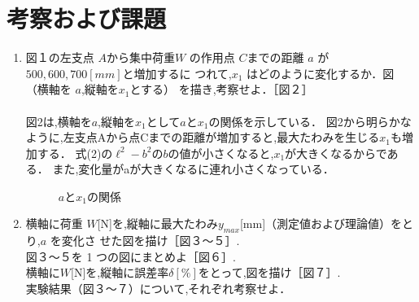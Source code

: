 \documentclass[a4paper,11pt]{jsarticle}
\begin{document}
\section{考察および課題}
\begin{enumerate}
  \item 図１の左支点 $A$から集中荷重$ W$ の作用点 $C $までの距離 $a$ が $500,600,700 [mm]$と増加するに
        つれて,$x_1$ はどのように変化するか．図（横軸を $a $,縦軸を$x_1$とする） を描き,考察せよ．［図２］\\
        \\
        \quad 図2は,横軸を$a$,縦軸を$x_1$として$a$と$x_1$の関係を示している．
        図2から明らかなように,左支点Aから点Cまでの距離が増加すると,最大たわみを生じる$x_1$も増加する．
        式(2)の$\ell^2-b^2$の$b$の値が小さくなると,$x_1$が大きくなるからである．
        また,変化量がaが大きくなるに連れ小さくなっている．

        \clearpage
        \begin{figure}[h]
          \centering
          \caption{$a$と$x_1$の関係}
        \end{figure}
        \clearpage

  \item 横軸に荷重 $W $[N]を,縦軸に最大たわみ$ y_{max}$[mm]（測定値および理論値）をとり,$a$ を変化さ
        せた図を描け［図３～５］.\\
        図３～５を 1 つの図にまとめよ［図６］.\\
        横軸に$ W $[N]を,縦軸に誤差率$ \delta [\%]$をとって,図を描け［図７］.\\
        実験結果（図３～７）について,それぞれ考察せよ．\\


\end{enumerate}
\end{document}
